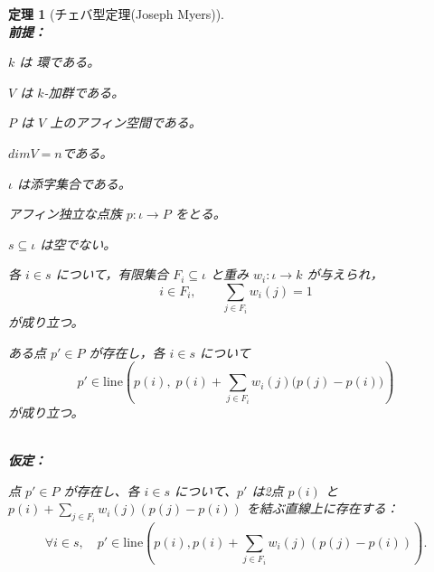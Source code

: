 \documentclass[a4paper,12pt]{bxjsbook}
\newlength{\customindent}
\newenvironment{body}{
  \par
  \begingroup
  \setlength{\leftskip}{\customindent}
  \setlength{\rightskip}{0pt}
  \setlength{\parindent}{1em}
  \setlength{\displayindent}{\customindent}
  \setlength{\displaywidth}{\dimexpr\linewidth-\customindent\relax}
}{
  \par
  \endgroup
}
\theoremstyle{theorem}
\newtheorem{theorem}{定理}[chapter]
\begin{document}
\begin{body}
    \begin{theorem}[チェバ型定理(Joseph Myers)]
        \noindent\textbf{\\前提：}\par
        \begin{theoremenumerate}[label=(A\arabic*), leftmargin=4em, topsep=2pt, partopsep=0pt, itemsep=0pt, parsep=0pt]
            \item $k$ は 環である。
            \item $V$ は $k$-加群である。
            \item $P$ は $V$ 上のアフィン空間である。
            \item $dimV = n$である。
            \item $\iota$ は添字集合である。
            \item アフィン独立な点族 $p : \iota \to P$ をとる。
            \item $s \subseteq \iota$ は空でない。
            \item 各 $i\in s$ について，有限集合 $F_i\subseteq \iota$ と重み $w_i:\iota\to k$ が与えられ，
            \[
            i\in F_i,\qquad \sum_{j\in F_i} w_i(j)=1
            \]
            が成り立つ。
            \item ある点 $p'\in P$ が存在し，各 $i\in s$ について
            \[
            p' \in \mathrm{line}\!\left(
            p(i),\;
            p(i)+\sum_{j\in F_i} w_i(j)\bigl(p(j)-p(i)\bigr)
            \right)
            \]
            が成り立つ。
        \end{theoremenumerate}
        \noindent\textbf{\\仮定：}\par
        \begin{theoremenumerate}[label=(A\arabic*), leftmargin=4em, topsep=2pt, partopsep=0pt, itemsep=0pt, parsep=0pt]
            \item 点 $p' \in P$ が存在し、各 $i \in s$ について、$p'$ は2点 $p(i)$ と $p(i) + \sum_{j \in F_i} w_i(j)(p(j) - p(i))$ を結ぶ直線上に存在する：
            \[
            \forall i \in s, \quad p' \in \mathrm{line}\left(p(i), p(i) + \sum_{j \in F_i} w_i(j)(p(j) - p(i))\right).
            \]
        \end{theoremenumerate}


\end{theorem}
\end{body}
\end{document}
